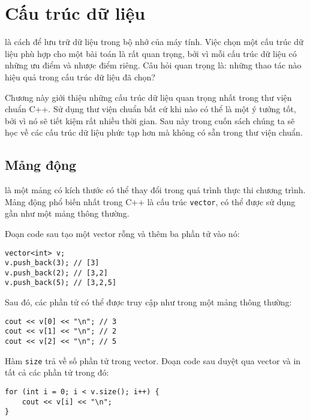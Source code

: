 \chapter{Cấu trúc dữ liệu}


 là cách để lưu trữ
dữ liệu trong bộ nhớ của máy tính.
Việc chọn một cấu trúc dữ liệu phù hợp cho một bài toán
là rất quan trọng,
bởi vì mỗi cấu trúc dữ liệu có những
ưu điểm và nhược điểm riêng.
Câu hỏi quan trọng là: những thao tác nào
hiệu quả trong cấu trúc dữ liệu đã chọn?

Chương này giới thiệu những cấu trúc dữ liệu
quan trọng nhất trong thư viện chuẩn C++.
Sử dụng thư viện chuẩn bất cứ khi nào có thể
là một ý tưởng tốt,
bởi vì nó sẽ tiết kiệm rất nhiều thời gian.
Sau này trong cuốn sách chúng ta sẽ học về các cấu trúc
dữ liệu phức tạp hơn mà không có sẵn
trong thư viện chuẩn.

\section{Mảng động}


 là một mảng có kích thước
có thể thay đổi trong quá trình thực thi
chương trình.
Mảng động phổ biến nhất trong C++ là
cấu trúc \texttt{vector},
có thể được sử dụng gần như một mảng thông thường.

Đoạn code sau tạo một vector rỗng và
thêm ba phần tử vào nó:

\begin{lstlisting}
vector<int> v;
v.push_back(3); // [3]
v.push_back(2); // [3,2]
v.push_back(5); // [3,2,5]
\end{lstlisting}

Sau đó, các phần tử có thể được truy cập như trong một mảng thông thường:

\begin{lstlisting}
cout << v[0] << "\n"; // 3
cout << v[1] << "\n"; // 2
cout << v[2] << "\n"; // 5
\end{lstlisting}

Hàm \texttt{size} trả về số phần tử trong vector.
Đoạn code sau duyệt qua
vector và in tất cả các phần tử trong đó:

\begin{lstlisting}
for (int i = 0; i < v.size(); i++) {
    cout << v[i] << "\n";
}
\end{lstlisting}

